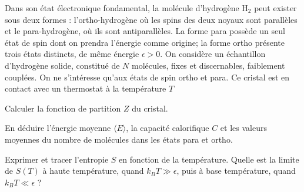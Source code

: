 Dans son état électronique fondamental, la molécule d'hydrogène H$_2$ peut exister sous deux formes : l'ortho-hydrogène où les spins des deux noyaux sont parallèles et le para-hydrogène, où ils sont antiparallèles. La forme para possède un seul état de spin dont on prendra l'énergie comme origine; la forme ortho présente trois états distincts, de même énergie $\epsilon >0$. On considère un échantillon d'hydrogène solide, constitué de $N$ molécules, fixes et discernables, faiblement couplées. On ne s'intéresse qu'aux états de spin ortho et para. Ce cristal est en contact avec un thermostat à la
température $T$


\question
Calculer la fonction de partition $Z$ du cristal.

\question
En déduire l'énergie moyenne $\langle E \rangle$, la capacité calorifique $C$ et les valeurs moyennes du nombre de molécules dans les états para et ortho.

\question
Exprimer et tracer l'entropie $S$ en fonction de la température.  Quelle est la limite de $S(T)$ à haute température, quand $k_BT \gg \epsilon $, puis à base température, quand $k_B T \ll \epsilon$ ?

